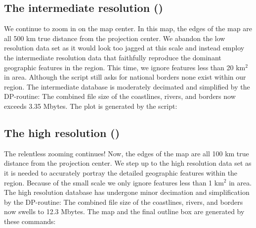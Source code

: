 


\subsection{The intermediate resolution ()} 

We continue to zoom in on the map center.  In this map, the
edges of the map are all 500 km true distance from the projection
center.  We abandon the low resolution data set as it would look
too jagged at this scale and instead employ the intermediate
resolution data that faithfully reproduce the dominant geographic
features in the region.  This time, we ignore features less than
20 km$^2$ in area.  Although the script still asks for national
borders none exist within our region.  The intermediate database
is moderately decimated and simplified by the DP-routine: The
combined file size of the coastlines, rivers, and borders now
exceeds 3.35 Mbytes.  The plot is generated by the script:




\subsection{The high resolution ()} 

The relentless zooming continues!  Now, the edges of the map
are all 100 km true distance from the projection center.  We
step up to the high resolution data set as it is needed to
accurately portray the detailed geographic features within the
region.  Because of the small scale we only ignore features less
than 1 km$^2$ in area.  The high resolution database has undergone
minor decimation and simplification by the DP-routine: The
combined file size of the coastlines, rivers, and borders now
swells to 12.3 Mbytes.  The map and the final outline box are
generated by these commands:



